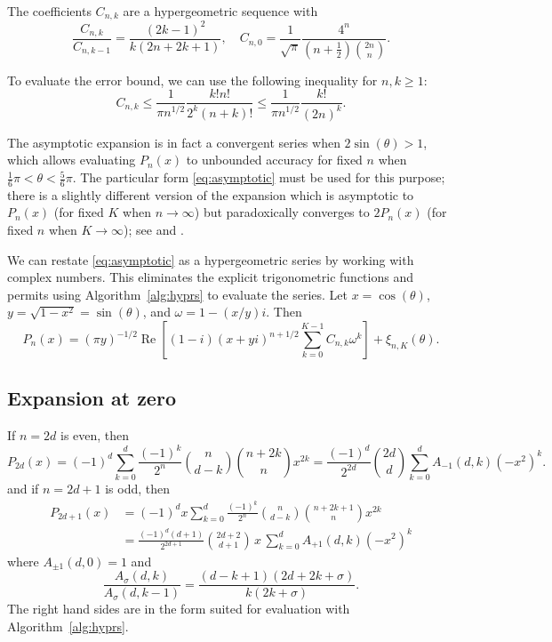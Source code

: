 \documentclass[11pt,a4paper]{article}
\begin{document}
The coefficients $C_{n,k}$ are a hypergeometric sequence with
$$\frac{C_{n,k}}{C_{n,k-1}} = \frac{(2k-1)^2}{k (2n+2k+1)}, \quad C_{n,0} = \frac{1}{\sqrt{\pi}} \frac{4^n}{(n+\tfrac{1}{2}) {2n \choose n}}.$$

To evaluate the error bound, we can use the following inequality for $n, k \ge 1$:
$$C_{n,k} \le \frac{1}{\pi n^{1/2}} \frac{k! n!}{2^k (n+k)!} \le \frac{1}{\pi n^{1/2}} \frac{k!}{(2n)^k}.$$

The asymptotic expansion is in fact a convergent series
when $2 \sin(\theta) > 1$, which allows evaluating $P_n(x)$ to unbounded
accuracy for fixed $n$ when $\tfrac{1}{6}\pi < \theta < \tfrac{5}{6} \pi$.
The particular form \eqref{eq:asymptotic}
must be used for this purpose; there is a slightly different version of the expansion
which is asymptotic to $P_n(x)$ (for fixed $K$ when $n \to \infty$)
but paradoxically
converges to $2 P_n(x)$ (for fixed $n$ when $K \to \infty$); see \cite{Olver1997} and \cite{Olver2010}.

We can restate \eqref{eq:asymptotic} as a hypergeometric series
by working with complex numbers. This eliminates the explicit trigonometric
functions and permits using Algorithm~\ref{alg:hyprs} to evaluate the series.
Let $x = \cos(\theta)$, $y = \sqrt{1-x^2} = \sin(\theta)$,
and $\omega = 1 - (x/y) i$. Then
\begin{equation}
\label{eq:asymptoticcomplex}
P_n(x) = (\pi y)^{-1/2} \operatorname{Re}\left[
(1-i) (x+y i)^{n+1/2}
\sum_{k=0}^{K-1} C_{n,k} \omega^k\right] + \xi_{n,K}(\theta).
\end{equation}

\subsection{Expansion at zero}

If $n = 2d$ is even, then
$$P_{2d}(x) = (-1)^d \sum_{k=0}^d \frac{(-1)^k}{2^n} {n \choose d-k} {n+2k \choose n} x^{2k} = \frac{(-1)^d}{2^{2d}} {2d \choose d} \sum_{k=0}^d A_{-1}(d,k) (-x^2)^k.$$
and if $n = 2d+1$ is odd, then
\begin{align*}
P_{2d+1}(x) &= (-1)^d x \sum_{k=0}^d \frac{(-1)^k}{2^n} {n \choose d-k} {n+2k+1 \choose n} x^{2k} \\
&= \frac{(-1)^d (d+1)}{2^{2d+1}} {2d+2 \choose d+1} \,x\, \sum_{k=0}^d A_{+1}(d,k) (-x^2)^k
\end{align*}
where $A_{\pm 1}(d,0) = 1$ and
$$\frac{A_{\sigma}(d,k)}{A_{\sigma}(d,k-1)} = \frac{(d-k+1) (2d+2k+\sigma)}{k (2k+\sigma)}.$$
The right hand sides are in the form suited for
evaluation with Algorithm~\ref{alg:hyprs}.
\end{document}
